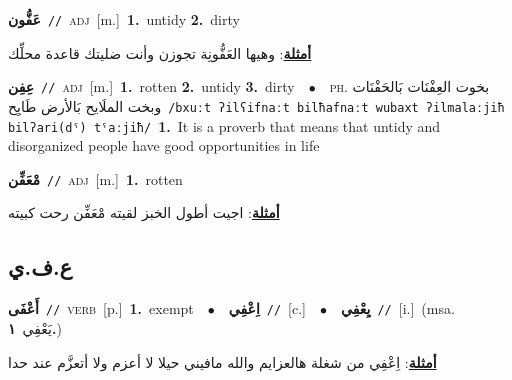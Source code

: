 \documentclass[10pt,a4paper,twoside]{article} %
\begin{document}
\begin{multicols}{2}
{\setlength\topsep{0pt}\textbf{\foreignlanguage{arabic}{عَفُّون}}\ {\color{gray}\texttt{//}\color{black}}\ \textsc{adj}\ [m.]\ \textbf{1.}~untidy  \textbf{2.}~dirty\  \begin{flushright}\color{gray}\foreignlanguage{arabic}{\textbf{\underline{\foreignlanguage{arabic}{أمثلة}}}: وهيها العَفُّونِة تجوزن وأنت ضليتك قاعدة محلِّك}\end{flushright}\color{black}} \vspace{2mm}

{\setlength\topsep{0pt}\textbf{\foreignlanguage{arabic}{عِفِن}}\ {\color{gray}\texttt{//}\color{black}}\ \textsc{adj}\ [m.]\ \textbf{1.}~rotten  \textbf{2.}~untidy  \textbf{3.}~dirty\ \ $\bullet$\ \ \textsc{ph.} \color{gray} \foreignlanguage{arabic}{بخوت العِفْنَات بَالحَفْنَات وبخت الملَايح بَالأرض طَايِح}\color{black}\ {\color{gray}\texttt{/{\sffamily bxuːt ʔilʕifnaːt bilħafnaːt wubaxt ʔilmalaːjiħ bilʔari(dˤ) tˤaːjiħ}/}\color{black}}\ \textbf{1.}~It is a proverb that means that untidy and disorganized people have good opportunities in life\ } \vspace{2mm}

{\setlength\topsep{0pt}\textbf{\foreignlanguage{arabic}{مْعَفِّن}}\ {\color{gray}\texttt{//}\color{black}}\ \textsc{adj}\ [m.]\ \textbf{1.}~rotten\  \begin{flushright}\color{gray}\foreignlanguage{arabic}{\textbf{\underline{\foreignlanguage{arabic}{أمثلة}}}: اجيت أطول الخبز لقيته مْعَفِّن رحت كبيته}\end{flushright}\color{black}} \vspace{2mm}

\vspace{-3mm}
\subsection*{\color{blue}\foreignlanguage{arabic}{ع.ف.ي}\color{blue}{}} 

{\setlength\topsep{0pt}\textbf{\foreignlanguage{arabic}{أَعْفَى}}\ {\color{gray}\texttt{//}\color{black}}\ \textsc{verb}\ [p.]\ \textbf{1.}~exempt\ \ $\bullet$\ \ \setlength\topsep{0pt}\textbf{\foreignlanguage{arabic}{اِعْفِي}}\ {\color{gray}\texttt{//}\color{black}}\ [c.]\ \ $\bullet$\ \ \setlength\topsep{0pt}\textbf{\foreignlanguage{arabic}{يِعْفِي}}\ {\color{gray}\texttt{//}\color{black}}\ [i.]\ \color{gray}(msa. \foreignlanguage{arabic}{يَعْفِي}~\foreignlanguage{arabic}{\textbf{١.}})\color{black}\  \begin{flushright}\color{gray}\foreignlanguage{arabic}{\textbf{\underline{\foreignlanguage{arabic}{أمثلة}}}: اِعْفِي من شغلة هالعزايم والله مافيني حيلا لا أعزم ولا أتعزَّم عند حدا}\end{flushright}\color{black}} \vspace{2mm}


\end{multicols}
\end{document}
